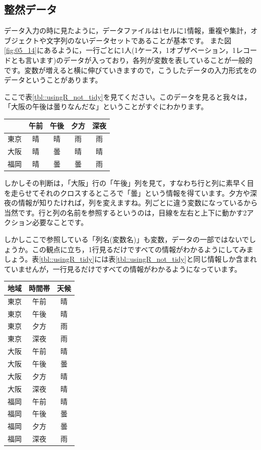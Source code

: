 \documentclass{ltjsbook}
\begin{document}
\subsection{整然データ}
データ入力の時に見たように，データファイルは1セルに1情報，重複や集計，オブジェクトや文字列のないデータセットであることが基本です。
また図\ref{fig:05_14}にあるように，一行ごとに1人(1ケース，1オブザベーション，1レコードとも言います)のデータが入っており，各列が変数を表していることが一般的です。変数が増えると横に伸びていきますので，こうしたデータの入力形式をのデータということがあります。

ここで表\ref{tbl::usingR_not_tidy}を見てください。このデータを見ると我々は，「大阪の午後は曇りなんだな」ということがすぐにわかります。
\begin{center}
	\begin{tabular}{c|cccc}
		   & 午前 & 午後 & 夕方 & 深夜 \\\hline
		東京 & 晴  & 晴  & 雨  & 雨  \\
		大阪 & 晴  & 曇  & 晴  & 晴  \\
		福岡 & 晴  & 曇  & 曇  & 雨  \\\hline
	\end{tabular}
	\label{tbl::usingR_not_tidy}
\end{center}
しかしその判断は，「大阪」行の「午後」列を見て，すなわち行と列に素早く目を走らせてそれのクロスするところで「曇」という情報を得ています。夕方や深夜の情報が知りたければ，列を変えますね。列ごとに違う変数になっているから当然です。行と列の名前を参照するというのは，目線を左右と上下に動かす2アクション必要なことです。

しかしここで参照している「列名(変数名)」も変数，データの一部ではないでしょうか。この観点に立ち，1行見るだけですべての情報がわかるようにしてみましょう。表\ref{tbl::usingR_tidy}には表\ref{tbl::usingR_not_tidy}と同じ情報しか含まれていませんが，一行見るだけですべての情報がわかるようになっています。

\begin{center}
	\begin{tabular}{ccc}
		地域 & 時間帯 & 天候 \\\hline
		東京 & 午前  & 晴  \\
		東京 & 午後  & 晴  \\
		東京 & 夕方  & 雨  \\
		東京 & 深夜  & 雨  \\
		大阪 & 午前  & 晴  \\
		大阪 & 午後  & 曇  \\
		大阪 & 夕方  & 晴  \\
		大阪 & 深夜  & 晴  \\
		福岡 & 午前  & 晴  \\
		福岡 & 午後  & 曇  \\
		福岡 & 夕方  & 曇  \\
		福岡 & 深夜  & 雨  \\\hline
	\end{tabular}
	\label{tbl::usingR_tidy}
\end{center}
\end{document}
